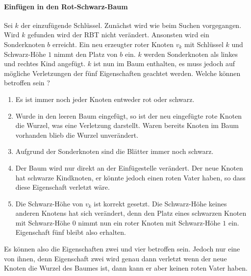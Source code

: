 \documentclass[a4paper,12pt]{article}
\begin{document}
\paragraph{Einfügen in den Rot-Schwarz-Baum}
Sei $k$ der einzufügende Schlüssel. Zunächst wird wie beim Suchen vorgegangen. Wird $k$ gefunden wird der RBT nicht verändert. Ansonsten wird ein Sonderknoten $b$ erreicht. Ein neu erzeugter roter Knoten $v_k$ mit Schlüssel $k$ und Schwarz-Höhe $1$ nimmt den Platz von $b$ ein. $k$ werden Sonderknoten als linkes und rechtes Kind angefügt. $k$ ist nun im Baum enthalten, es muss jedoch auf mögliche Verletzungen der fünf Eigenschaften geachtet werden. Welche können betroffen sein ?

\begin{enumerate}
	\item Es ist immer noch jeder Knoten entweder rot oder schwarz.
	\item Wurde in den leeren Baum eingefügt, so ist der neu eingefügte rote Knoten die Wurzel, was eine Verletzung darstellt.  Waren bereits Knoten im Baum vorhanden blieb die Wurzel unverändert.
	\item Aufgrund der Sonderknoten sind die Blätter immer noch schwarz.
	\item Der Baum wird nur direkt an der Einfügestelle verändert. Der neue Knoten hat schwarze Kindknoten, er könnte jedoch einen roten Vater haben, so dass diese Eigenschaft verletzt wäre.
	\item Die Schwarz-Höhe von $v_k$ ist korrekt gesetzt. Die Schwarz-Höhe keines anderen Knotens hat sich verändert, denn den Platz eines schwarzen Knoten mit Schwarz-Höhe $0$ nimmt nun ein roter Knoten mit Schwarz-Höhe $1$ ein. Eigenschaft fünf bleibt also erhalten. 
\end{enumerate}  

\noindent Es können also die Eigenschaften zwei und vier betroffen sein. Jedoch nur eine von ihnen, denn Eigenschaft zwei wird genau dann verletzt wenn der neue Knoten die Wurzel des Baumes ist, dann kann er aber keinen roten Vater haben.
\end{document}
